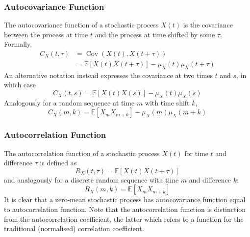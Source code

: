 \documentclass[11pt]{report} %
\begin{document}
\subsubsection{Autocovariance Function}

The autocovariance function of a stochastic process $X\left(t\right)$ is the covariance between the process at time $t$ and the process at time shifted by some $\tau$. Formally,
\begin{align}
C_{X}\left(t, \tau\right) &= \operatorname{Cov}\left(X\left(t\right), X\left(t + \tau\right)\right) \\
&= \mathbb{E}\left[X\left(t\right)X\left(t+\tau\right)\right] - \mu_{X}\left(t\right)\mu_{X}\left(t + \tau\right)
\end{align}
An alternative notation instead expresses the covariance at two times $t$ and $s$, in which case
\begin{equation}
C_{X}\left(t, s\right) = \mathbb{E}\left[X\left(t\right)X\left(s\right)\right] - \mu_{X}\left(t\right)\mu_{X}\left(s\right)
\end{equation}
Analogously for a random sequence at time $m$ with time shift $k$,
\begin{equation}
C_{X}\left(m, k\right) = \mathbb{E}\left[X_{m}X_{m + k}\right] - \mu_{X}\left(m\right)\mu_{X}\left(m + k\right)
\end{equation}

\subsubsection{Autocorrelation Function}

The autocorrelation function of a stochastic process $X\left(t\right)$ for time $t$ and difference $\tau$ is defined as
\begin{equation}
R_{X}\left(t, \tau\right) = \mathbb{E}\left[X\left(t\right)X\left(t+\tau\right)\right]
\end{equation}
and analogously for a discrete random sequence with time $m$ and difference $k$:
\begin{equation}
R_{X}\left(m, k\right) =  \mathbb{E}\left[X_{m}X_{m + k}\right]
\end{equation}
It is clear that a zero-mean stochastic process has autocovariance function equal to autocorrelation function. Note that the autocorrelation function is distinction from the autocorrelation coefficient, the latter which refers to a function for the traditional (normalised) correlation coefficient.
\end{document}
